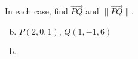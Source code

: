 \documentclass[../main.tex]{subfiles}
\begin{document}
In each case, find $\overrightarrow{PQ}$ and $\|\overrightarrow{PQ}\|$.
\begin{enumerate}[a)]
	\setcounter{enumi}{1}
	\item $P(2, 0, 1)$, $Q(1, -1, 6)$
\end{enumerate}

\solution
\begin{enumerate}[a)]
	\setcounter{enumi}{1}
	\item 
\end{enumerate}
\end{document}

